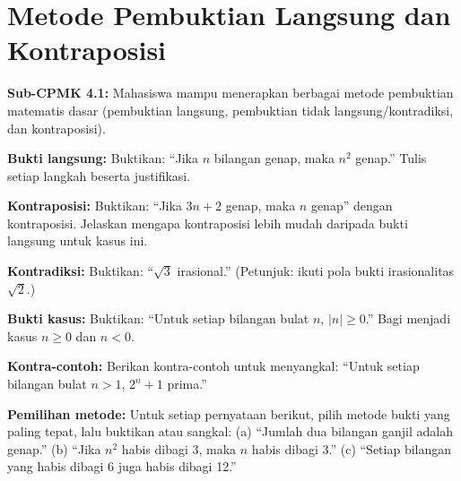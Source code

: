 \documentclass[../main]{subfiles}
\begin{document}
\chapter{Metode Pembuktian Langsung dan Kontraposisi}

\begin{subcpmk}
  \item \textbf{Sub-CPMK 4.1:} Mahasiswa mampu menerapkan berbagai metode pembuktian matematis dasar (pembuktian langsung, pembuktian tidak langsung/kontradiksi, dan kontraposisi).
\end{subcpmk}










\begin{aktivitas}
  \item \textbf{Bukti langsung:} Buktikan: ``Jika $n$ bilangan genap, maka $n^2$ genap.'' Tulis setiap langkah beserta justifikasi.
  \item \textbf{Kontraposisi:} Buktikan: ``Jika $3n + 2$ genap, maka $n$ genap'' dengan kontraposisi. Jelaskan mengapa kontraposisi lebih mudah daripada bukti langsung untuk kasus ini.
  \item \textbf{Kontradiksi:} Buktikan: ``$\sqrt{3}$ irasional.'' (Petunjuk: ikuti pola bukti irasionalitas $\sqrt{2}$.)
  \item \textbf{Bukti kasus:} Buktikan: ``Untuk setiap bilangan bulat $n$, $|n| \geq 0$.'' Bagi menjadi kasus $n \geq 0$ dan $n < 0$.
  \item \textbf{Kontra-contoh:} Berikan kontra-contoh untuk menyangkal: ``Untuk setiap bilangan bulat $n > 1$, $2^n + 1$ prima.''
  \item \textbf{Pemilihan metode:} Untuk setiap pernyataan berikut, pilih metode bukti yang paling tepat, lalu buktikan atau sangkal: (a) ``Jumlah dua bilangan ganjil adalah genap.'' (b) ``Jika $n^2$ habis dibagi 3, maka $n$ habis dibagi 3.'' (c) ``Setiap bilangan yang habis dibagi 6 juga habis dibagi 12.''
\end{aktivitas}
\end{document}
